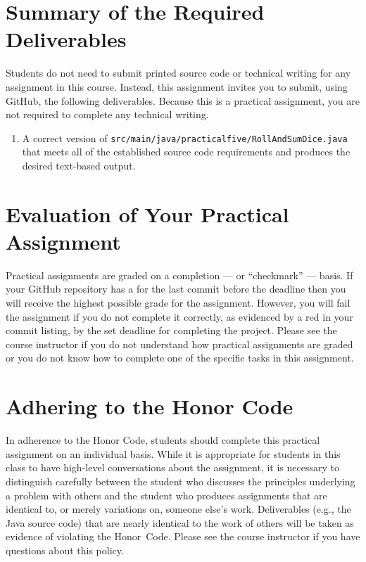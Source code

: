 \documentclass[11pt]{article}
\newcommand{\mainprogramsource}{\lstinline{src/main/java/practicalfive/RollAndSumDice.java}}
\newcommand{\checkmark}{\ding{51}}
\newcommand{\naughtmark}{\ding{55}}
\begin{document}
\section*{Summary of the Required Deliverables}

\noindent Students do not need to submit printed source code or technical
writing for any assignment in this course. Instead, this assignment invites you
to submit, using GitHub, the following deliverables. Because this is a practical
assignment, you are not required to complete any technical writing.

\begin{enumerate}

\setlength{\itemsep}{0in}

\item A correct version of \mainprogramsource{} that meets all of the established source code requirements and produces
  the desired text-based output.

\end{enumerate}

\section*{Evaluation of Your Practical Assignment}

Practical assignments are graded on a completion --- or ``checkmark'' --- basis.
If your GitHub repository has a \checkmark{} for the last commit before the
deadline then you will receive the highest possible grade for the assignment.
However, you will fail the assignment if you do not complete it correctly, as
evidenced by a red \naughtmark{} in your commit listing, by the set deadline for
completing the project. Please see the course instructor if you do not
understand how practical assignments are graded or you do not know how to
complete one of the specific tasks in this assignment.

\section*{Adhering to the Honor Code}

In adherence to the Honor Code, students should complete this practical assignment on an individual basis. While it is
appropriate for students in this class to have high-level conversations about the assignment, it is necessary to
distinguish carefully between the student who discusses the principles underlying a problem with others and the student
who produces assignments that are identical to, or merely variations on, someone else's work. Deliverables (e.g., the
Java source code) that are nearly identical to the work of others will be taken as evidence of violating the \mbox{Honor
Code}. Please see the course instructor if you have questions about this policy.
\end{document}
